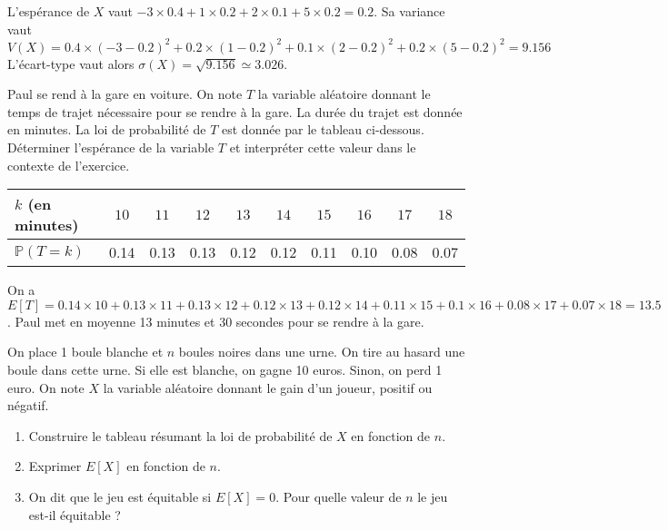 \documentclass[11pt,fleqn, openany]{book} %
\begin{document}
\begin{solution}L'espérance de $X$ vaut $-3 \times 0.4+1 \times 0.2 + 2 \times 0.1 + 5 \times 0.2 = 0.2$. Sa variance vaut
\[V(X)=0.4 \times (-3-0.2)^2 + 0.2 \times (1-0.2)^2 + 0.1 \times (2-0.2)^2 + 0.2 \times (5-0.2)^2=9.156\]
L'écart-type vaut alors $\sigma(X)=\sqrt{9.156}\simeq 3.026$.\end{solution}




\begin{exercise}[topic=prob02]Paul se rend à la gare en voiture. On note $T$ la variable aléatoire donnant le temps de trajet nécessaire pour se rendre à la gare. La durée du trajet est donnée en minutes. La loi de probabilité de $T$ est donnée par le tableau ci-dessous. Déterminer l'espérance de la variable $T$ et interpréter cette valeur dans le contexte de l'exercice.


\begin{center}
\begin{tabular}{|l|c|c|c|c|c|c|c|c|c|}
\hline
$k$ (en minutes) & $10$ & $11$ & $12$ & $13$ &$14$&$15$&$16$&$17$&$18$ \\
\hline
$\mathbb{P}(T=k)$ & 0.14 & 0.13 & 0.13 & 0.12 & 0.12&0.11&0.10&0.08&0.07\\
\hline \end{tabular}
\end{center}\end{exercise}

\begin{solution}On a $E[T]=0.14 \times 10 + 0.13 \times 11 + 0.13 \times 12 + 0.12 \times 13 + 0.12 \times 14 + 0.11 \times 15 + 0.1 \times 16 + 0.08 \times 17 + 0.07 \times 18=13.5$. Paul met en moyenne 13 minutes et 30 secondes pour se rendre à la gare.\end{solution}




\begin{exercise}[topic=prob02] On place 1 boule blanche et $n$ boules noires dans une urne. On tire au hasard une boule dans cette urne. Si elle est blanche, on gagne 10 euros. Sinon, on perd 1 euro. On note $X$ la variable aléatoire donnant le gain d'un joueur, positif ou négatif.
\begin{enumerate}
\item Construire le tableau résumant la loi de probabilité de $X$ en fonction de $n$.
\item Exprimer $E[X]$ en fonction de $n$.
\item On dit que le jeu est équitable si $E[X]=0$. Pour quelle valeur de $n$ le jeu est-il équitable ?
\end{enumerate}\end{exercise}
\end{document}
